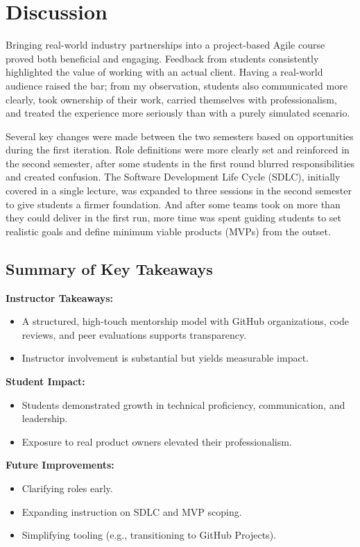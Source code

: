 \documentclass{article}
\begin{document}
\section{Discussion}
Bringing real-world industry partnerships into a project-based Agile course proved both beneficial and engaging. Feedback from students consistently highlighted the value of working with an actual client. Having a real-world audience raised the bar; from my observation, students also communicated more clearly, took ownership of their work, carried themselves with professionalism, and treated the experience more seriously than with a purely simulated scenario.

Several key changes were made between the two semesters based on opportunities during the first iteration. Role definitions were more clearly set and reinforced in the second semester, after some students in the first round blurred responsibilities and created confusion. The Software Development Life Cycle (SDLC), initially covered in a single lecture, was expanded to three sessions in the second semester to give students a firmer foundation. And after some teams took on more than they could deliver in the first run, more time was spent guiding students to set realistic goals and define minimum viable products (MVPs) from the outset.

\subsection{Summary of Key Takeaways}

\textbf{Instructor Takeaways:}
\begin{itemize}[noitemsep]
  \item A structured, high-touch mentorship model with GitHub organizations, code reviews, and peer evaluations supports transparency.
  \item Instructor involvement is substantial but yields measurable impact.
\end{itemize}

\textbf{Student Impact:}
\begin{itemize}[noitemsep]
  \item Students demonstrated growth in technical proficiency, communication, and leadership.
  \item Exposure to real product owners elevated their professionalism.
\end{itemize}

\textbf{Future Improvements:}
\begin{itemize}[noitemsep]
  \item Clarifying roles early.
  \item Expanding instruction on SDLC and MVP scoping.
  \item Simplifying tooling (e.g., transitioning to GitHub Projects).
\end{itemize}
\end{document}
